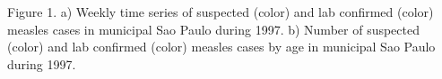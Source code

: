 Figure 1. a) Weekly time series of suspected (color) and lab
confirmed (color) measles cases in municipal Sao Paulo during 1997. b)
Number of suspected (color) and lab confirmed (color) measles cases by
age in municipal Sao Paulo during 1997.